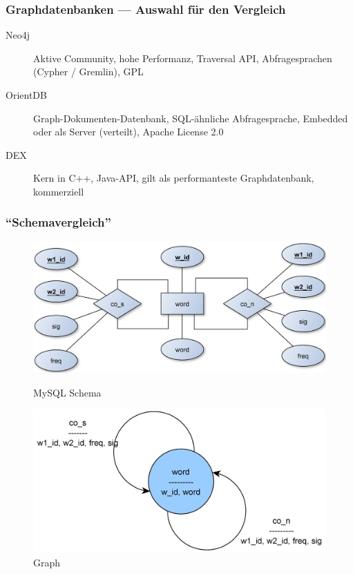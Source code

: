 \documentclass{beamer}
\begin{document}
\begin{frame}\frametitle{Graphdatenbanken --- Auswahl für den Vergleich}
	\begin{description}
		\item[Neo4j] Aktive Community, hohe Performanz, Traversal API, Abfragesprachen (Cypher / Gremlin), GPL
		\item[OrientDB] Graph-Dokumenten-Datenbank, SQL-ähnliche Abfragesprache, Embedded oder als Server (verteilt), Apache License 2.0
		\item[DEX] Kern in C++, Java-API, gilt als performanteste Graphdatenbank, kommerziell
	\end{description}
\end{frame}

\begin{frame}\frametitle{``Schemavergleich''}
\begin{figure}[ht]
\begin{minipage}[b]{0.45\linewidth}
\centering
\includegraphics[scale=0.055]{images/mysql_schema}
\caption{MySQL Schema}
\label{fig:mysql_schema}
\end{minipage}
\hspace{0.5cm}
\begin{minipage}[b]{0.45\linewidth}
\centering
\includegraphics[scale=0.075]{images/graph_schema.jpg}
\caption{Graph}
\label{fig:graph_schema}
\end{minipage}
\end{figure}
\end{frame}
\end{document}
